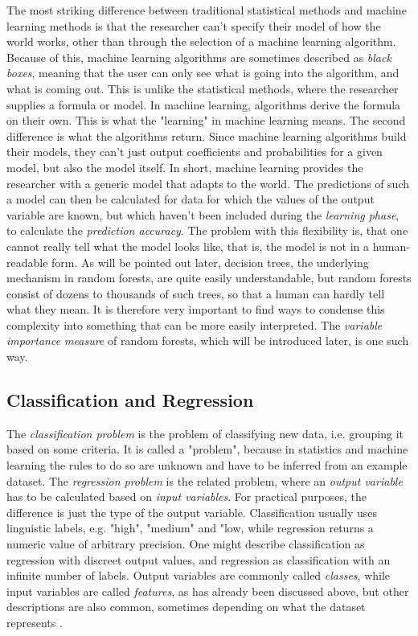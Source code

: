 \documentclass[a4paper,man,12pt,apacite,floatsintext,draftfirst]{apa6} %
\begin{document}
The most striking difference between traditional statistical methods and
machine learning methods is that the researcher can't specify their model of
how the world works, other than through the selection of a machine learning
algorithm.
Because of this, machine learning algorithms are sometimes described as
\emph{black boxes}, meaning that the user can only see what is going into the
algorithm, and what is coming out.
This is unlike the statistical methods, where the researcher supplies a
formula or model.
In machine learning, algorithms derive the formula on their own.
This is what the "learning" in machine learning means.
The second difference is what the algorithms return.
Since machine learning algorithms build their models,
they can't just output coefficients and probabilities for a given model,
but also the model itself.
In short, machine learning provides the researcher with a generic model
that adapts to the world.
The predictions of such a model can then be calculated for data for which
the values of the output variable are known, but which haven't
been included during the \emph{learning phase},
to calculate the \emph{prediction accuracy}.
The problem with this flexibility is, that one cannot really tell what the
model looks like, that is, the model is not in a human-readable form.
As will be pointed out later, decision trees, the underlying mechanism in
random forests, are quite easily understandable, but random forests
consist of dozens to thousands of such trees, so that a human can hardly
tell what they mean.
It is therefore very important to find ways to condense this complexity
into something that can be more easily interpreted.
The \emph{variable importance measure} of random forests, which will be introduced
later, is one such way.

\subsection{Classification and Regression}
The \emph{classification problem} is the problem of classifying new data,
i.e. grouping it based on some criteria.
It is called a "problem", because in statistics and machine learning the
rules to do so are unknown and have to be inferred from an example dataset.
The \emph{regression problem} is the related problem, where an
\emph{output variable} has to be calculated based on \emph{input variables}.
For practical purposes, the difference is just the type of the output variable.
Classification usually uses linguistic labels, e.g. "high", "medium" and "low,
while regression returns a numeric value of arbitrary precision.
One might describe classification as regression with discreet output values,
and regression as classification with an infinite number of labels.
Output variables are commonly called \emph{classes}, while input variables
are called \emph{features}, as has already been discussed above, but
other descriptions are also common, sometimes depending on what the dataset
represents \cite{strobl2009introduction}.
\end{document}
